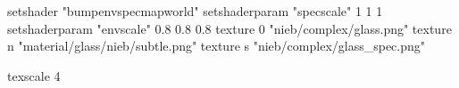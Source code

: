 setshader "bumpenvspecmapworld"
setshaderparam "specscale" 1 1 1
setshaderparam "envscale"  0.8 0.8 0.8
   texture 0 "nieb/complex/glass.png"
   texture n "material/glass/nieb/subtle.png"
   texture s "nieb/complex/glass_spec.png"

texscale 4
